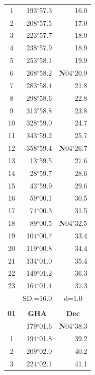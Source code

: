 \documentclass[10pt, a4paper]{report}
\begin{document}
\begin{scriptsize}
\begin{tabular*}{0.2\textwidth}[t]{@{\extracolsep{\fill}}|c|rr|}
1 & 193$^\circ$57.3 & 16.0\\
2 & 208$^\circ$57.5 & 17.0\\
3 & 223$^\circ$57.7 & \raisebox{0.24ex}{\boldmath$\cdot$~\boldmath$\cdot$~~}18.0\\
4 & 238$^\circ$57.9 & 18.9\\
5 & 253$^\circ$58.1 & 19.9\\[2Pt]
6 & 268$^\circ$58.2 & \textbf{N}04$^\circ$20.9\\
7 & 283$^\circ$58.4 & 21.8\\
8 & 298$^\circ$58.6 & 22.8\\
9 & 313$^\circ$58.8 & \raisebox{0.24ex}{\boldmath$\cdot$~\boldmath$\cdot$~~}23.8\\
10 & 328$^\circ$59.0 & 24.7\\
11 & 343$^\circ$59.2 & 25.7\\[2Pt]
12 & 358$^\circ$59.4 & \textbf{N}04$^\circ$26.7\\
13 & 13$^\circ$59.5 & 27.6\\
14 & 28$^\circ$59.7 & 28.6\\
15 & 43$^\circ$59.9 & \raisebox{0.24ex}{\boldmath$\cdot$~\boldmath$\cdot$~~}29.6\\
16 & 59$^\circ$00.1 & 30.5\\
17 & 74$^\circ$00.3 & 31.5\\[2Pt]
18 & 89$^\circ$00.5 & \textbf{N}04$^\circ$32.5\\
19 & 104$^\circ$00.7 & 33.4\\
20 & 119$^\circ$00.8 & 34.4\\
21 & 134$^\circ$01.0 & \raisebox{0.24ex}{\boldmath$\cdot$~\boldmath$\cdot$~~}35.4\\
22 & 149$^\circ$01.2 & 36.3\\
23 & 164$^\circ$01.4 & 37.3\\
\hline
\rule{0pt}{2.4ex} & \multicolumn{1}{c}{SD.=16.0} & \multicolumn{1}{c|}{d=1.0}\\
\hline
\multicolumn{1}{c}{}\\[-0.5ex]\hline
\multicolumn{1}{|c|}{\rule{0pt}{2.6ex}\textbf{01}} & \multicolumn{1}{c}{\textbf{GHA}} & \multicolumn{1}{c|}{\textbf{Dec}}\\
\hline\rule{0pt}{2.6ex}\noindent
0 & 179$^\circ$01.6 & \textbf{N}04$^\circ$38.3\\
1 & 194$^\circ$01.8 & 39.2\\
2 & 209$^\circ$02.0 & 40.2\\
3 & 224$^\circ$02.1 & \raisebox{0.24ex}{\boldmath$\cdot$~\boldmath$\cdot$~~}41.1\\

\end{tabular*}
\end{scriptsize}
\end{document}

